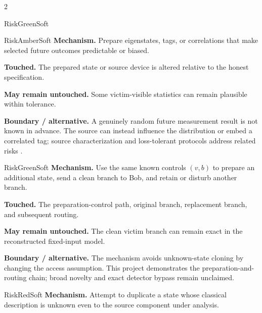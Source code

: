 \begin{multicols}{2}
\begin{matrixrecord}{RiskGreenSoft}
\hfill\matrixback
\end{matrixrecord}

\hypertarget{cell:D2}{}
\begin{matrixrecord}{RiskAmberSoft}
\textbf{Mechanism.} Prepare eigenstates, tags, or correlations that make selected future outcomes predictable or biased.

\textbf{Touched.} The prepared state or source device is altered relative to the honest specification.

\textbf{May remain untouched.} Some victim-visible statistics can remain plausible within tolerance.

\textbf{Boundary / alternative.} A genuinely random future measurement result is not known in advance. The source can instead influence the distribution or embed a correlated tag; source characterization and loss-tolerant protocols address related risks \cite{tamaki2014loss,jiang2024sidechannel}.

\hfill\matrixback
\end{matrixrecord}

\hypertarget{cell:D3}{}
\begin{matrixrecord}{RiskGreenSoft}
\textbf{Mechanism.} Use the same known controls $(v,b)$ to prepare an additional state, send a clean branch to Bob, and retain or disturb another branch.

\textbf{Touched.} The preparation-control path, original branch, replacement branch, and subsequent routing.

\textbf{May remain untouched.} The clean victim branch can remain exact in the reconstructed fixed-input model.

\textbf{Boundary / alternative.} The mechanism avoids unknown-state cloning by changing the access assumption. This project demonstrates the preparation-and-routing chain; broad novelty and exact detector bypass remain unclaimed.

\hfill\matrixback
\end{matrixrecord}

\hypertarget{cell:D4}{}
\begin{matrixrecord}{RiskRedSoft}
\textbf{Mechanism.} Attempt to duplicate a state whose classical description is unknown even to the source component under analysis.


\end{matrixrecord}
\end{multicols}
